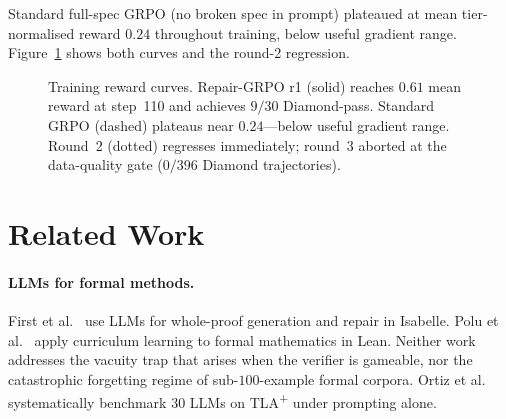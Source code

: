 \documentclass[10pt,twocolumn]{article}
\begin{document}
Standard full-spec GRPO (no broken spec in prompt) plateaued at mean
tier-normalised reward $0.24$ throughout training, below useful gradient range.
Figure~\ref{fig:grpo} shows both curves and the round-2 regression.

\begin{figure}[t]
\centering
{}
\caption{Training reward curves.
Repair-GRPO r1 (solid) reaches $0.61$ mean reward at step~110 and achieves
$9/30$ Diamond-pass.
Standard GRPO (dashed) plateaus near $0.24$---below useful gradient range.
Round~2 (dotted) regresses immediately; round~3 aborted at the data-quality
gate ($0/396$ Diamond trajectories).}
\label{fig:grpo}
\end{figure}

\section{Related Work}
\label{sec:related}

\paragraph{LLMs for formal methods.}
First et al.~\cite{first2023baldur} use LLMs for whole-proof generation and
repair in Isabelle.
Polu et al.~\cite{polu2022formal} apply curriculum learning to formal
mathematics in Lean.
Neither work addresses the vacuity trap that arises when the verifier is
gameable, nor the catastrophic forgetting regime of sub-$100$-example
formal corpora.
Ortiz et al.~\cite{ortiz2026formallm} systematically benchmark $30$ LLMs
on TLA\textsuperscript{+} under prompting alone.
\end{document}
